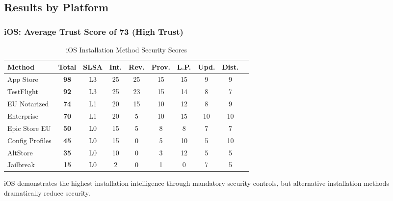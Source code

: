 \documentclass[11pt,a4paper]{article}
\begin{document}
\subsection{Results by Platform}

\subsubsection{iOS: Average Trust Score of 73 (High Trust)}

\begin{table}[h]
\centering
\caption{iOS Installation Method Security Scores}
\begin{tabular}{lccccccccc}
\toprule
\textbf{Method} & \textbf{Total} & \textbf{SLSA} & \textbf{Int.} & \textbf{Rev.} & \textbf{Prov.} & \textbf{L.P.} & \textbf{Upd.} & \textbf{Dist.} \\
\midrule
App Store & \textbf{98} & L3 & 25 & 25 & 15 & 15 & 9 & 9 \\
TestFlight & \textbf{92} & L3 & 25 & 23 & 15 & 14 & 8 & 7 \\
EU Notarized & \textbf{74} & L1 & 20 & 15 & 10 & 12 & 8 & 9 \\
Enterprise & \textbf{70} & L1 & 20 & 5 & 10 & 15 & 10 & 10 \\
Epic Store EU & \textbf{50} & L0 & 15 & 5 & 8 & 8 & 7 & 7 \\
Config Profiles & \textbf{45} & L0 & 15 & 0 & 5 & 10 & 5 & 10 \\
AltStore & \textbf{35} & L0 & 10 & 0 & 3 & 12 & 5 & 5 \\
Jailbreak & \textbf{15} & L0 & 2 & 0 & 1 & 0 & 7 & 5 \\
\bottomrule
\end{tabular}
\end{table}

iOS demonstrates the highest installation intelligence through mandatory security controls, but alternative installation methods dramatically reduce security.
\end{document}
